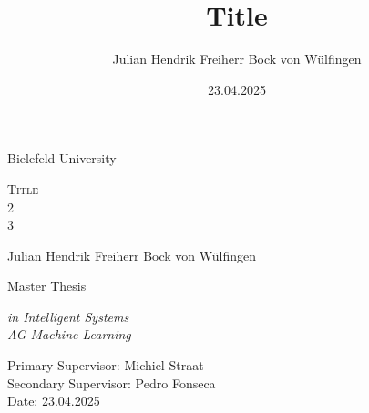 \documentclass{report} %
\title{
    Title
}
\author{Julian Hendrik Freiherr Bock von Wülfingen}
\date{23.04.2025}
\begin{document}
\onehalfspacing


\begin{titlepage}

	\begin{center}

        \vspace*{\baselineskip}

        {\Large Bielefeld University}
        
        \vspace{1.75\baselineskip}

        {\LARGE \scshape Title \\ 2 \\ 3\par} %

        \vspace{5\baselineskip}
        
        {\Large Julian Hendrik Freiherr Bock von Wülfingen}
        
        \vspace{2\baselineskip}

        {\Large Master Thesis\vspace{1em}}
        
        \textit{in Intelligent Systems \vspace{1em} \\ AG Machine Learning}
	
        \vfill

        \vspace{0.3\baselineskip}
        
        Primary Supervisor:     Michiel Straat\\
        Secondary Supervisor:   Pedro Fonseca\\
        Date:		            23.04.2025

    \end{center}

\end{titlepage}

\tableofcontents

\cleardoublepage
{}

% 



% 

% 

% 

% 

% 

% 
% 


% 
\end{document}
